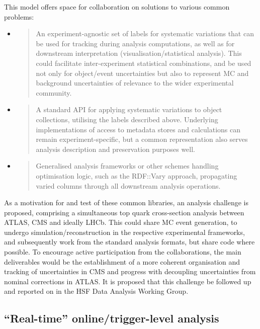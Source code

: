 \documentclass[a4paper,11pt]{article}
\begin{document}
This model offers space for collaboration on solutions to various common
problems:

\begin{itemize}
\item
  \begin{quote}
  An experiment-agnostic set of labels for systematic variations that
  can be used for tracking during analysis computations, as well as for
  downstream interpretation (visualisation/statistical analysis). This
  could facilitate inter-experiment statistical combinations, and be
  used not only for object/event uncertainties but also to represent MC
  and background uncertainties of relevance to the wider experimental
  community.
  \end{quote}
\item
  \begin{quote}
  A standard API for applying systematic variations to object
  collections, utilising the labels described above. Underlying
  implementations of access to metadata stores and calculations can
  remain experiment-specific, but a common representation also serves
  analysis description and preservation purposes well.
  \end{quote}
\item
  \begin{quote}
  Generalised analysis frameworks or other schemes handling optimisation
  logic, such as the RDF::Vary approach, propagating varied columns
  through all downstream analysis operations.
  \end{quote}
\end{itemize}

As a motivation for and test of these common libraries, an analysis
challenge is proposed, comprising a simultaneous top quark cross-section
analysis between ATLAS, CMS and ideally LHCb. This could share MC event
generation, to undergo simulation/recon\-struc\-tion in the respective
experimental frameworks, and subsequently work from the standard
analysis formats, but share code where possible. To encourage active
participation from the collaborations, the main deliverables would be
the establishment of a more coherent organisation and tracking of
uncertainties in CMS and progress with decoupling uncertainties from
nominal corrections in ATLAS. It is proposed that this challenge be
followed up and reported on in the HSF Data Analysis Working Group.

\hypertarget{real-time-onlinetrigger-level-analysis}{%
\subsection{``Real-time'' online/trigger-level
analysis}\label{real-time-onlinetrigger-level-analysis}}
\end{document}
